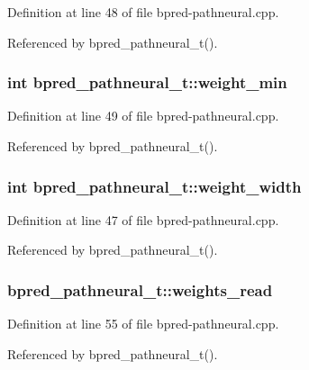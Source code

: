 Definition at line 48 of file bpred-pathneural.cpp.

Referenced by bpred\_\-pathneural\_\-t().
\subsubsection[{weight\_\-min}]{\setlength{\rightskip}{0pt plus 5cm}int {\bf bpred\_\-pathneural\_\-t::weight\_\-min}\hspace{0.3cm}{\tt  [protected]}}\label{classbpred__pathneural__t_e556de20ec42d1c6b3bf02ee142bb709}




Definition at line 49 of file bpred-pathneural.cpp.

Referenced by bpred\_\-pathneural\_\-t().
\subsubsection[{weight\_\-width}]{\setlength{\rightskip}{0pt plus 5cm}int {\bf bpred\_\-pathneural\_\-t::weight\_\-width}\hspace{0.3cm}{\tt  [protected]}}\label{classbpred__pathneural__t_450c156ffcc0a6bcf6e193417798a990}




Definition at line 47 of file bpred-pathneural.cpp.

Referenced by bpred\_\-pathneural\_\-t().
\subsubsection[{weights\_\-read}]{ {\bf bpred\_\-pathneural\_\-t::weights\_\-read}\hspace{0.3cm}{\tt  [protected]}}\label{classbpred__pathneural__t_cd18053f1159c3c4a6e4bcddf2e5e58f}




Definition at line 55 of file bpred-pathneural.cpp.

Referenced by bpred\_\-pathneural\_\-t().
